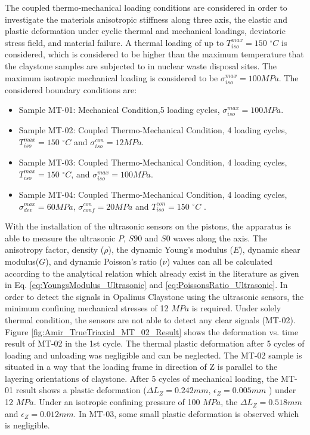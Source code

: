 The coupled thermo-mechanical loading conditions are considered in order to investigate the materials anisotropic stiffness along three axis, the elastic and plastic deformation under cyclic thermal and mechanical loadings, deviatoric stress field, and material failure. A thermal loading of up to $T_{iso}^{max}=150$ $^{\circ}C$ is considered, which is considered to be higher than the maximum temperature that the claystone samples are subjected to in nuclear waste disposal sites. The maximum isotropic mechanical loading is considered to be $\sigma_{iso}^{max}=100 MPa$. The considered boundary conditions are:


\begin{itemize}
  \item Sample MT-01: Mechanical Condition,5 loading cycles, $\sigma_{iso}^{max}=100 MPa$.
  \item Sample MT-02: Coupled Thermo-Mechanical Condition, 4 loading cycles, $T_{iso}^{max}=150$ $^{\circ}C$ and $\sigma_{iso}^{con}=12 MPa$.
  \item Sample MT-03: Coupled Thermo-Mechanical Condition, 4 loading cycles, $T_{iso}^{max}=150$ $^{\circ}C$, and $\sigma_{iso}^{max}=100 MPa$.
  \item Sample MT-04: Coupled Thermo-Mechanical Condition, 4 loading cycles, $\sigma_{dev}^{max}=60 MPa$, $\sigma_{conf}^{con}= 20 MPa$ and $T_{iso}^{con}=150$ $^{\circ}C$ .
\end{itemize}


With the installation of the ultrasonic sensors on the pistons, the apparatus is able to measure the ultrasonic $P$, $S90$ and $S0$ waves along the axis. The anisotropy factor, density ($\rho$), the dynamic Young’s modulus ($E$), dynamic shear modulus($G$), and dynamic Poisson’s ratio ($\nu$) values can all be calculated according to the analytical relation which already exist in the literature \cite{Motraetal2018} as given in Eq. \ref{eq:YoungsModulus_Ultrasonic} and \ref{eq:PoissonsRatio_Ultrasonic}. In order to detect the signals in Opalinus Claystone using the ultrasonic sensors, the minimum confining mechanical stresses of 12 $MPa$ is required. Under solely thermal condition, the sensors are not able to detect any clear signals (MT-02). Figure \ref{fig:Amir_TrueTriaxial_MT_02_Result} shows the deformation vs. time result of MT-02 in the 1st cycle. The thermal plastic deformation after 5 cycles of loading and unloading was negligible and can be neglected. The MT-02 sample is situated in a way that the loading frame in direction of Z is parallel to the layering orientations of claystone. After 5 cycles of mechanical loading, the MT-01 result shows a plastic deformation ($\Delta L_Z=0.242 mm$, $\epsilon_Z=0.005 mm$ ) under 12 $MPa$. Under an isotropic confining pressure of 100 $MPa$, the $\Delta L_Z=0.518 mm$ and $\epsilon_Z=0.012 mm$. In MT-03, some small plastic deformation is observed which is negligible.


